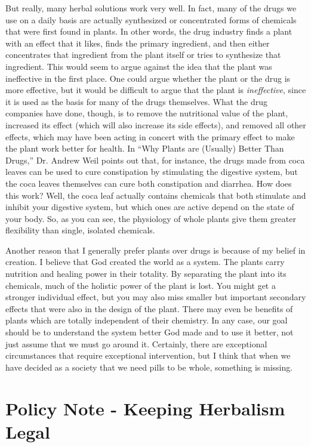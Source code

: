But really, many herbal solutions work very well.  In fact, many of the
drugs we use on a daily basis are actually synthesized or concentrated
forms of chemicals that were first found in plants. In other words, the
drug industry finds a plant with an effect that it likes, finds the
primary ingredient, and then either concentrates that ingredient from
the plant itself or tries to synthesize that ingredient.  This would
seem to argue against the idea that the plant was ineffective in the
first place. One could argue whether the plant or the drug is more
effective, but it would be difficult to argue that the plant is
\textit{ineffective}, since it is used as the basis for many of the
drugs themselves.  What the drug companies have done, though, is to
remove the nutritional value of the plant, increased its effect (which
will also increase its side effects), and removed all other effects,
which may have been acting in concert with the primary effect to make
the plant work better for health.  In “Why Plants are (Usually) Better
Than Drugs,” Dr. Andrew Weil points out that, for instance, the drugs
made from coca leaves can be used to cure constipation by stimulating
the digestive system, but the coca leaves themselves can cure both
constipation and diarrhea.  How does this work?  Well, the coca leaf
actually contains chemicals that both stimulate and inhibit your
digestive system, but which ones are active depend on the state of your
body.  So, as you can see, the physiology of whole plants give them
greater flexibility than single, isolated chemicals. 


 Another reason that I generally prefer plants over drugs is because of
my belief in creation. I believe that God created the world as a
system. The plants carry nutrition and healing power in their totality.
By separating the plant into its chemicals, much of the holistic power
of the plant is lost. You might get a stronger individual effect, but
you may also miss smaller but important secondary effects that were
also in the design of the plant. There may even be benefits of plants
which are totally independent of their chemistry.  In any case, our
goal should be to understand the system better God made and to use it
better, not just assume that we must go around it. Certainly, there are
exceptional circumstances that require exceptional intervention, but I
think that when we have decided as a society that we need pills to be
whole, something is missing.

\section{Policy Note - Keeping Herbalism Legal}

